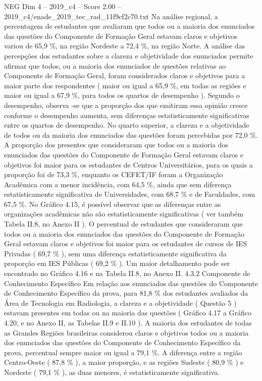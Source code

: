 \begin{textsample}{NEG Dim 4 – 2019\_c4 – Score 2.00 – 2019\_c4/enade\_2019\_tec\_rad\_11f9cf2c70.txt}
Na análise regional, a percentagem de estudantes que avaliaram que todos ou a maioria dos enunciados das questões do Componente de Formação Geral estavam claros e objetivos variou de 65,9 \%, na região Nordeste a 72,4 \%, na região Norte.
A análise das percepções dos estudantes sobre a clareza e objetividade dos enunciados permite afirmar que todos, ou a maioria dos enunciados de questões relativas ao Componente de Formação Geral, foram considerados claros e objetivos para a maior parte dos respondentes ( maior ou igual a 65,9 \%, em todas as regiões e maior ou igual a 67,9 \%, para todos os quartos de desempenho ).
Segundo o desempenho, observa -se que a proporção dos que emitiram essa opinião cresce conforme o desempenho aumenta, sem diferenças estatisticamente significativas entre os quartos de desempenho.
No quarto superior, a clareza e a objetividade de todos ou da maioria dos enunciados das questões foram percebidas por 72,0 \%.
A proporção dos presentes que consideraram que todos ou a maioria dos enunciados das questões do Componente de Formação Geral estavam claros e objetivos foi maior para os estudantes de Centros Universitários, para os quais a proporção foi de 73,3 \%, enquanto os CEFET/IF foram a Organização Acadêmica com a menor incidência, com 64,5 \%, ainda que sem diferença estatisticamente significativa de Universidades, com 68,7 \% e de Faculdades, com 67,5 \%.
No Gráfico 4.15, é possível observar que as diferenças entre as organizações acadêmicas não são estatisticamente significativas ( ver também Tabela II.8, no Anexo II ).
O percentual de estudantes que consideraram que todos ou a maioria dos enunciados das questões do Componente de Formação Geral estavam claros e objetivos foi maior para os estudantes de cursos de IES Privadas ( 69,7 \% ), sem uma diferença estatisticamente significativa da proporção em IES Públicas ( 69,2 \% ).
Um maior detalhamento pode ser encontrado no Gráfico 4.16 e na Tabela II.8, no Anexo II. 4.3.2 Componente de Conhecimento Específico Em relação aos enunciados das questões do Componente de Conhecimento Específico da prova, para 81,8 \% dos estudantes avaliados da Área de Tecnologia em Radiologia, a clareza e a objetividade ( Questão 5 ) estavam presentes em todas ou na maioria das questões ( Gráfico 4.17 a Gráfico 4.20, e no Anexo II, as Tabelas II.9 e II.10 ).
A maioria dos estudantes de todas as Grandes Regiões brasileiras considerou claros e objetivos todos ou a maioria dos enunciados das questões do Componente de Conhecimento Específico da prova, percentual sempre maior ou igual a 79,1 \%.
A diferença entre a região Centro-Oeste ( 87,8 \% ), a maior proporção, e as regiões Sudeste ( 80,9 \% ) e Nordeste ( 79,1 \% ), as duas menores, é estatisticamente significativa.

\end{textsample}
